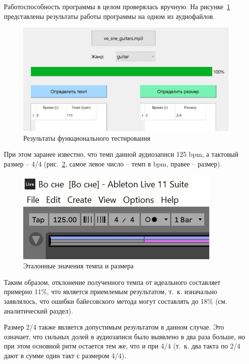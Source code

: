 Работоспособность программы в целом проверялась вручную. На рисунке~\ref{img:test_const} представлены результаты работы программы на одном из аудиофайлов.

\begin{figure}[h]
	\centering
	\includegraphics[scale=0.9]{inc/img/test_constant.jpg}
	\caption{Результаты функционального тестирования}
	\label{img:test_const}
\end{figure}

\newpage

При этом заранее известно, что темп данной аудиозаписи 125 bpm, а тактовый размер -- 4/4 (рис.~\ref{img:vosne_ref}, самое левое число -- темп в bpm, правее -- размер).

\begin{figure}[h]
	\centering
	\includegraphics[scale=1.4]{inc/img/vosne_ref.jpg}
	\caption{Эталонные значения темпа и размера}
	\label{img:vosne_ref}
\end{figure}

Таким образом, отклонение полученного темпа от идеального составляет примерно 11\%, что является приемлемым результатом, т.~к. изначально заявлялось, что ошибки байесовского метода могут составлять до 18\% (см. аналитический раздел).

Размер 2/4 также является допустимым результатом в данном случае. Это означает, что сильных долей в аудиозаписи было выявлено в два раза больше, но при этом основной ритм остается тем же, что и при 4/4 (т.~к. два такта по 2/4 дают в сумме один такт с размером 4/4).


